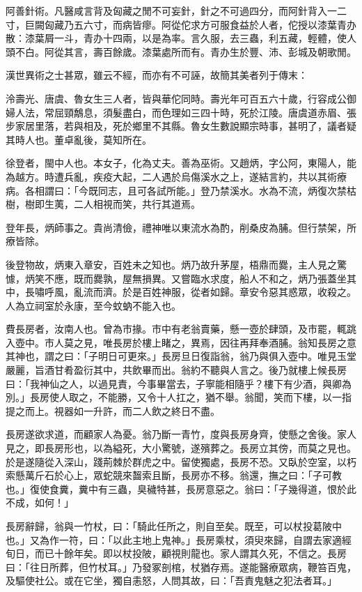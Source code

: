 \begin{pinyinscope}
阿善針術。凡醫咸言背及匈藏之閒不可妄針，針之不可過四分，而阿針背入一二寸，巨闕匈藏乃五六寸，而病皆瘳。阿從佗求方可服食益於人者，佗授以漆葉青办散：漆葉屑一斗，青办十四兩，以是為率。言久服，去三蟲，利五藏，輕體，使人頭不白。阿從其言，壽百餘歲。漆葉處所而有。青办生於豐、沛、彭城及朝歌閒。

漢世異術之士甚眾，雖云不經，而亦有不可誣，故簡其美者列于傳末：

泠壽光、唐虞、魯女生三人者，皆與華佗同時。壽光年可百五六十歲，行容成公御婦人法，常屈頸鷮息，須髮盡白，而色理如三四十時，死於江陵。唐虞道赤眉、張步家居里落，若與相及，死於鄉里不其縣。魯女生數說顯宗時事，甚明了，議者疑其時人也。董卓亂後，莫知所在。

徐登者，閩中人也。本女子，化為丈夫。善為巫術。又趙炳，字公阿，東陽人，能為越方。時遭兵亂，疾疫大起，二人遇於烏傷溪水之上，遂結言約，共以其術療病。各相謂曰：「今既同志，且可各試所能。」登乃禁溪水。水為不流，炳復次禁枯樹，樹即生荑，二人相視而笑，共行其道焉。

登年長，炳師事之。貴尚清儉，禮神唯以東流水為酌，削桑皮為脯。但行禁架，所療皆除。

後登物故，炳東入章安，百姓未之知也。炳乃故升茅屋，梧鼎而爨，主人見之驚懅，炳笑不應，既而爨孰，屋無損異。又嘗臨水求度，船人不和之，炳乃張蓋坐其中，長嘯呼風，亂流而濟。於是百姓神服，從者如歸。章安令惡其惑眾，收殺之。人為立祠室於永康，至今蚊蚋不能入也。

費長房者，汝南人也。曾為市掾。市中有老翁賣藥，懸一壺於肆頭，及市罷，輒跳入壺中。市人莫之見，唯長房於樓上睹之，異焉，因往再拜奉酒脯。翁知長房之意其神也，謂之曰：「子明日可更來。」長房旦日復詣翁，翁乃與俱入壺中。唯見玉堂嚴麗，旨酒甘肴盈衍其中，共飲畢而出。翁約不聽與人言之。後乃就樓上候長房曰：「我神仙之人，以過見責，今事畢當去，子寧能相隨乎？樓下有少酒，與卿為別。」長房使人取之，不能勝，又令十人扛之，猶不舉。翁聞，笑而下樓，以一指提之而上。視器如一升許，而二人飲之終日不盡。

長房遂欲求道，而顧家人為憂。翁乃斷一青竹，度與長房身齊，使懸之舍後。家人見之，即長房形也，以為縊死，大小驚號，遂殯葬之。長房立其傍，而莫之見也。於是遂隨從入深山，踐荊棘於群虎之中。留使獨處，長房不恐。又臥於空室，以朽索懸萬斤石於心上，眾蛇競來齧索且斷，長房亦不移。翁還，撫之曰：「子可教也。」復使食糞，糞中有三蟲，臭穢特甚，長房意惡之。翁曰：「子幾得道，恨於此不成，如何！」

長房辭歸，翁與一竹杖，曰：「騎此任所之，則自至矣。既至，可以杖投葛陂中也。」又為作一符，曰：「以此主地上鬼神。」長房乘杖，須臾來歸，自謂去家適經旬日，而已十餘年矣。即以杖投陂，顧視則龍也。家人謂其久死，不信之。長房曰：「往日所葬，但竹杖耳。」乃發冢剖棺，杖猶存焉。遂能醫療眾病，鞭笞百鬼，及驅使社公。或在它坐，獨自恚怒，人問其故，曰：「吾責鬼魅之犯法者耳。」


\end{pinyinscope}
